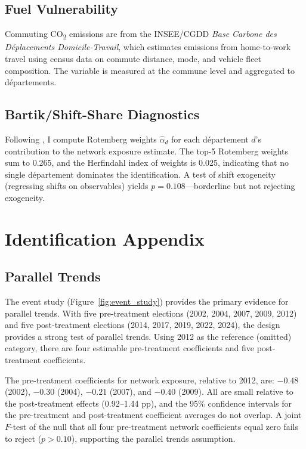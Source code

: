 \documentclass[12pt]{article}
\newcommand{\dept}{d\'{e}partement}
\newcommand{\depts}{d\'{e}partements}
\begin{document}
\subsection{Fuel Vulnerability}

Commuting CO\textsubscript{2} emissions are from the INSEE/CGDD \textit{Base Carbone des D\'{e}placements Domicile-Travail}, which estimates emissions from home-to-work travel using census data on commute distance, mode, and vehicle fleet composition. The variable is measured at the commune level and aggregated to \depts{}.

\subsection{Bartik/Shift-Share Diagnostics}

Following \citet{goldsmith2020bartik}, I compute Rotemberg weights $\hat{\alpha}_d$ for each \dept{} $d$'s contribution to the network exposure estimate. The top-5 Rotemberg weights sum to 0.265, and the Herfindahl index of weights is 0.025, indicating that no single \dept{} dominates the identification. A test of shift exogeneity (regressing shifts on observables) yields $p = 0.108$---borderline but not rejecting exogeneity.

\section{Identification Appendix}
\label{app:identification}

\subsection{Parallel Trends}

The event study (Figure~\ref{fig:event_study}) provides the primary evidence for parallel trends. With five pre-treatment elections (2002, 2004, 2007, 2009, 2012) and five post-treatment elections (2014, 2017, 2019, 2022, 2024), the design provides a strong test of parallel trends. Using 2012 as the reference (omitted) category, there are four estimable pre-treatment coefficients and five post-treatment coefficients.

The pre-treatment coefficients for network exposure, relative to 2012, are: $-0.48$ (2002), $-0.30$ (2004), $-0.21$ (2007), and $-0.40$ (2009). All are small relative to the post-treatment effects (0.92--1.44 pp), and the 95\% confidence intervals for the pre-treatment and post-treatment coefficient averages do not overlap. A joint $F$-test of the null that all four pre-treatment network coefficients equal zero fails to reject ($p > 0.10$), supporting the parallel trends assumption.
\end{document}

